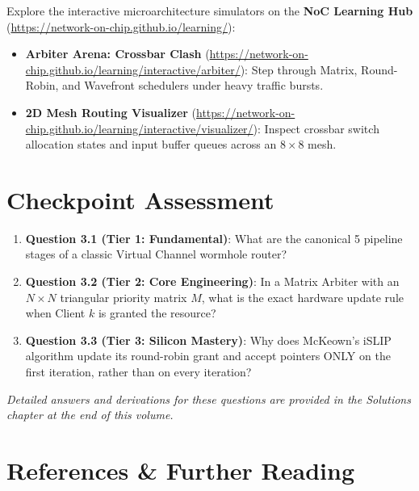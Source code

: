 Explore the interactive microarchitecture simulators on the \textbf{NoC Learning Hub} (\url{https://network-on-chip.github.io/learning/}):
\begin{itemize}
    \item \textbf{Arbiter Arena: Crossbar Clash} (\url{https://network-on-chip.github.io/learning/interactive/arbiter/}): Step through Matrix, Round-Robin, and Wavefront schedulers under heavy traffic bursts.
    \item \textbf{2D Mesh Routing Visualizer} (\url{https://network-on-chip.github.io/learning/interactive/visualizer/}): Inspect crossbar switch allocation states and input buffer queues across an $8 \times 8$ mesh.
\end{itemize}

\section{Checkpoint Assessment}
\label{sec:ch3_assessment}

\begin{enumerate}
    \item \textbf{Question 3.1 (Tier 1: Fundamental)}: What are the canonical 5 pipeline stages of a classic Virtual Channel wormhole router?
    \item \textbf{Question 3.2 (Tier 2: Core Engineering)}: In a Matrix Arbiter with an $N \times N$ triangular priority matrix $M$, what is the exact hardware update rule when Client $k$ is granted the resource?
    \item \textbf{Question 3.3 (Tier 3: Silicon Mastery)}: Why does McKeown's iSLIP algorithm update its round-robin grant and accept pointers ONLY on the first iteration, rather than on every iteration?
\end{enumerate}
\emph{Detailed answers and derivations for these questions are provided in the Solutions chapter at the end of this volume.}

\section{References \& Further Reading}
\label{sec:ch3_references}

